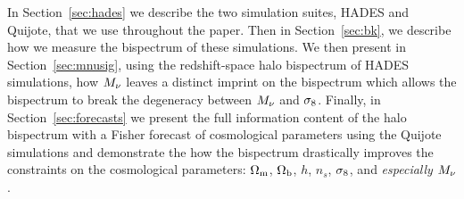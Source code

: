In Section~\ref{sec:hades} we describe the two simulation suites, HADES and Quijote, 
that we use throughout the paper. Then in Section~\ref{sec:bk}, we describe how 
we measure the bispectrum of these simulations. We then present in Section~\ref{sec:mnusig}, 
using the redshift-space halo bispectrum of HADES simulations, how $M_\nu$ leaves 
a distinct imprint on the bispectrum which allows the bispectrum to break the 
degeneracy between $M_\nu$ and $\sigma_8$. Finally, in Section~\ref{sec:forecasts} 
we present the full information content of the halo bispectrum with a Fisher 
forecast of cosmological parameters using the Quijote simulations and demonstrate 
the how the bispectrum drastically improves the constraints on the cosmological 
parameters: $\Omega_{\rm m}$, $\Omega_{\rm b}$, $h$, $n_s$, $\sigma_8$, and {\em especially} $M_\nu$. 
